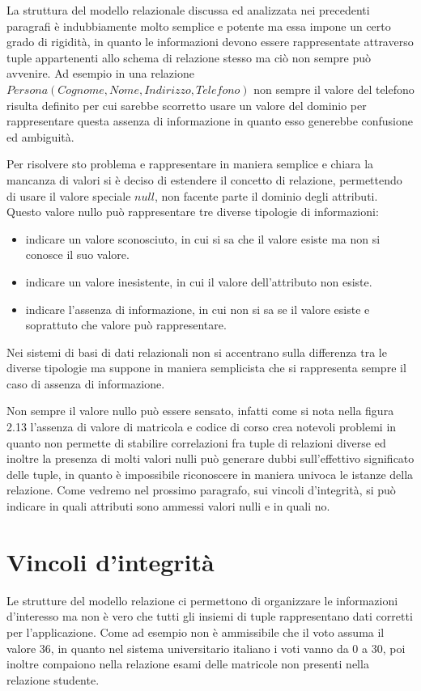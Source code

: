 \documentclass[a4paper,12pt, oneside]{book}
\begin{document}
La struttura del modello relazionale discussa ed analizzata nei precedenti paragrafi è indubbiamente molto
semplice e potente ma essa impone un certo grado di rigidità, in quanto le informazioni devono essere
rappresentate attraverso tuple appartenenti allo schema di relazione stesso ma ciò non sempre può avvenire.\newline
Ad esempio in una relazione $Persona(Cognome, Nome, Indirizzo, Telefono)$ non sempre il valore del telefono
risulta definito per cui sarebbe scorretto usare un valore del dominio per rappresentare questa assenza di
informazione in quanto esso generebbe confusione ed ambiguità.

Per risolvere sto problema e rappresentare in maniera semplice e chiara la mancanza di valori si è deciso di
estendere il concetto di relazione, permettendo di usare il valore speciale $null$, non facente parte il
dominio degli attributi.\newline
Questo valore nullo può rappresentare tre diverse tipologie di informazioni:
\begin{itemize}
    \item indicare un valore sconosciuto, in cui si sa che il valore esiste ma non si conosce il suo valore.
    \item indicare un valore inesistente, in cui il valore dell'attributo non esiste.
    \item indicare l'assenza di informazione, in cui non si sa se il valore esiste e soprattuto che valore può
          rappresentare.
\end{itemize}
Nei sistemi di basi di dati relazionali non si accentrano sulla differenza tra le diverse tipologie ma suppone
in maniera semplicista che si rappresenta sempre il caso di assenza di informazione.

Non sempre il valore nullo può essere sensato, infatti come si nota nella figura 2.13 l'assenza di valore di
matricola e codice di corso crea notevoli problemi in quanto non permette di stabilire correlazioni fra tuple
di relazioni diverse ed inoltre la presenza di molti valori nulli può generare dubbi sull'effettivo
significato delle tuple, in quanto è impossibile riconoscere in maniera univoca le istanze della relazione.\newline
Come vedremo nel prossimo paragrafo, sui vincoli d'integrità, si può indicare in quali attributi sono ammessi
valori nulli e in quali no.

\section{Vincoli d'integrità}
Le strutture del modello relazione ci permettono di organizzare le informazioni d'interesso ma non è vero che
tutti gli insiemi di tuple rappresentano dati corretti per l'applicazione.\newline
Come ad esempio non è ammissibile che il voto assuma il valore 36, in quanto nel sistema universitario italiano i voti vanno da 0 a 30, poi inoltre compaiono nella relazione esami delle matricole non presenti nella relazione studente.
\end{document}
